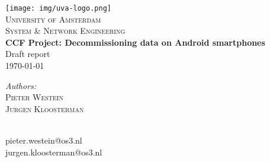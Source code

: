 \begin{titlepage}
\begin{center}
\texttt{[image: img/uva-logo.png]}\\[1cm]    
\textsc{\LARGE University of Amsterdam}\\[0.5cm]
\textsc{\Large System \& Network Engineering}\\[2cm]
{\huge \bfseries CCF Project: Decommissioning data on Android smartphones}\\[0.2cm]
{Draft report}\\[0.4cm]
{\large \today}\\
\end{center}

\vfill

\begin{minipage}[t]{0.4\textwidth}
\begin{flushleft} \large
\emph{Authors:}\\
\textsc{Pieter Westein}\\
\textsc{Jurgen Kloosterman}\\[1cm]
\end{flushleft}
\end{minipage}
\begin{minipage}[t]{0.4\textwidth}
\begin{flushright} \large
\mbox{ }\\
pieter.westein@os3.nl\\
jurgen.kloosterman@os3.nl\\
\end{flushright}
\end{minipage}
\end{titlepage}